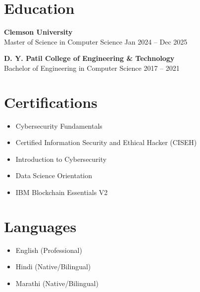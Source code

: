 \documentclass[10pt]{article}
\begin{document}
\vspace{0.2cm}

\section*{Education}
\textbf{Clemson University} \\
Master of Science in Computer Science \hfill Jan 2024 -- Dec 2025

\vspace{0.2cm}

\textbf{D. Y. Patil College of Engineering \& Technology} \\
Bachelor of Engineering in Computer Science \hfill 2017 -- 2021

\vspace{0.2cm}

\section*{Certifications}
\begin{itemize}[noitemsep, topsep=0pt]
    \item Cybersecurity Fundamentals
    \item Certified Information Security and Ethical Hacker (CISEH)
    \item Introduction to Cybersecurity
    \item Data Science Orientation
    \item IBM Blockchain Essentials V2
\end{itemize}

\vspace{0.2cm}

\section*{Languages}
\begin{itemize}[noitemsep, topsep=0pt]
    \item English (Professional)
    \item Hindi (Native/Bilingual)
    \item Marathi (Native/Bilingual)
\end{itemize}
\end{document}
